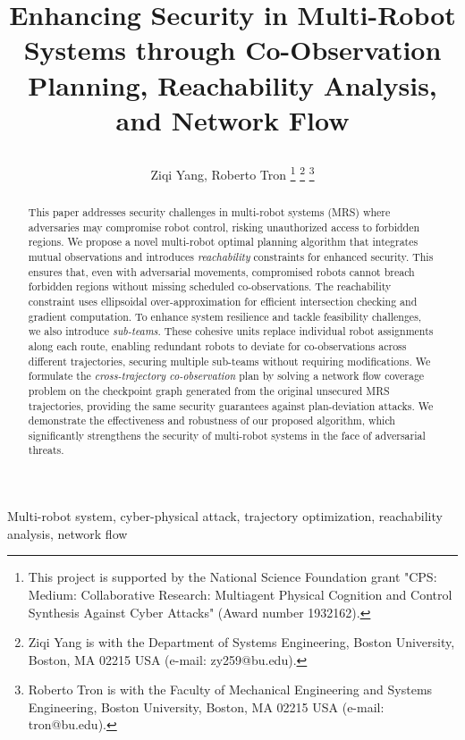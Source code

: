 \documentclass[10pt,twocolumn,twoside]{IEEEtran}
\title{\LARGE \bf

Enhancing Security in Multi-Robot Systems through Co-Observation Planning, Reachability Analysis, and Network Flow}
\author{Ziqi Yang, Roberto Tron \IEEEmembership{Member, IEEE} 
\thanks{This project is supported by the National Science Foundation grant "CPS: Medium: Collaborative Research: Multiagent Physical Cognition and Control Synthesis Against Cyber Attacks" (Award number 1932162).}
\thanks{Ziqi Yang is with the Department of Systems Engineering,
Boston University, Boston, MA 02215 USA (e-mail: zy259@bu.edu).
}
\thanks{Roberto Tron is with the Faculty of Mechanical Engineering and Systems Engineering, Boston University, Boston, MA 02215 USA (e-mail:
tron@bu.edu).}}
\begin{document}
\maketitle
\thispagestyle{empty}
\pagestyle{empty}




\begin{abstract}
This paper addresses security challenges in multi-robot systems (MRS) where adversaries may compromise robot control, risking unauthorized access to forbidden regions. We propose a novel multi-robot optimal planning algorithm that integrates mutual observations and introduces \emph{reachability} constraints for enhanced security. This ensures that, even with adversarial movements, compromised robots cannot breach forbidden regions without missing scheduled co-observations. The reachability constraint uses ellipsoidal over-approximation for efficient intersection checking and gradient computation. To enhance system resilience and tackle feasibility challenges, we also introduce \emph{sub-teams}. These cohesive units replace individual robot assignments along each route, enabling redundant robots to deviate for co-observations across different trajectories, securing multiple sub-teams without requiring modifications. We formulate the \emph{cross-trajectory co-observation} plan by solving a network flow coverage problem on the checkpoint graph generated from the original unsecured MRS trajectories, providing the same security guarantees against plan-deviation attacks. We demonstrate the effectiveness and robustness of our proposed algorithm, which significantly strengthens the security of multi-robot systems in the face of adversarial threats.
\end{abstract}
\begin{IEEEkeywords}
  Multi-robot system, cyber-physical attack, trajectory optimization, reachability analysis, network flow
\end{IEEEkeywords}
\end{document}
